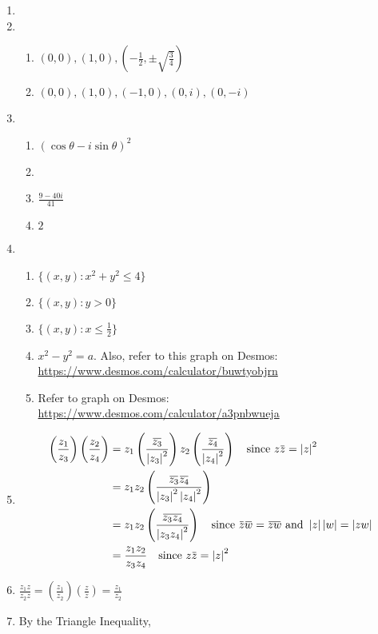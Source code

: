 \documentclass[11pt, oneside]{book}
\begin{document}
\begin{enumerate}
	\item 
	\item \begin{enumerate}
		\item $(0, 0), (1, 0), (-\frac{1}{2} , \pm \sqrt{\frac{3}{4}})$
		\item $(0, 0), (1, 0), (-1, 0), (0, i), (0, -i)$
	\end{enumerate}
	\item \begin{enumerate}
		\item $(\cos \theta - i \sin \theta)^2$
		\item 
		\item $\frac{9 - 40i}{41}$
		\item $2$
	\end{enumerate}
	\item \begin{enumerate}
		\item $\{(x, y) : x^2 + y^2 \leq 4\}$
		\item $\{(x, y) : y > 0\}$
		\item $\{(x, y) : x \leq \frac{1}{2} \}$
		\item $x^2 - y^2 = a$. Also, refer to this graph on Desmos: \url{https://www.desmos.com/calculator/buwtyobjrn}
		\item Refer to graph on Desmos: \url{https://www.desmos.com/calculator/a3pnbwueja}
	\end{enumerate}
	\item \begin{align*}
		\left( \frac{z_1}{z_3} \right) \left( \frac{z_2}{z_4} \right)
			&= z_1 \left( \frac{\bar{z_3}}{\abs{z_3}^2} \right) z_2 \left( \frac{\bar{z_4}}{\abs{z_4}^2} \right) \quad \text{since } z\bar{z} = \abs{z}^2 \\
			&= z_1 z_2 \left( \frac{\bar{z_3} \bar{z_4}}{\abs{z_3}^2 \abs{z_4}^2} \right) \\
			&= z_1 z_2 \left( \frac{\bar{z_3 z_4}}{\abs{z_3 z_4}^2} \right) \quad \text{since } \bar{z}\bar{w} = \bar{zw} \text{ and } \abs{z}\abs{w} = \abs{zw} \\
			&= \frac{z_1 z_2}{z_3 z_4} \quad \text{since } z\bar{z} = \abs{z}^2
	\end{align*}
	\item $\frac{z_1 z}{z_2 z} = \left( \frac{z_1}{z_2} \right) \left(\frac{z}{z} \right) = \frac{z_1}{z_2}$
	\item By the Triangle Inequality,
	\begin{equation*}

\end{equation*}
\end{enumerate}
\end{document}
